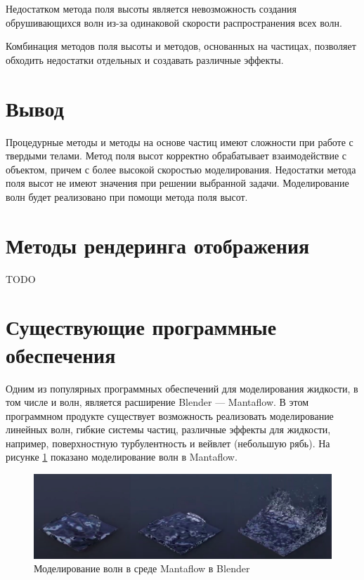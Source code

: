 Недостатком метода поля высоты является невозможность создания обрушивающихся волн  из-за одинаковой скорости распространения всех волн.

Комбинация методов поля высоты и методов, основанных на частицах, позволяет обходить недостатки отдельных и создавать различные эффекты.

\section*{Вывод}

Процедурные методы и методы на основе частиц имеют сложности при работе с твердыми телами. Метод поля высот корректно обрабатывает взаимодействие с объектом, причем с более высокой скоростью моделирования. Недостатки метода поля высот не имеют значения при решении выбранной задачи. Моделирование волн будет реализовано при помощи метода поля высот.

\section{Методы рендеринга отображения}

TODO

\section{Существующие программные обеспечения}

Одним из популярных программных обеспечений для моделирования жидкости, в том числе и волн, является расширение Blender --- Mantaflow. В этом программном продукте существует возможность реализовать моделирование линейных волн, гибкие системы частиц, различные эффекты для жидкости, например, поверхностную турбулентность и вейвлет (небольшую рябь). На рисунке \ref{img:mantaflow} показано моделирование волн в Mantaflow. 

\begin{figure}[H]
	\begin{center}
		\includegraphics[scale=0.2]{img/mantaflow.png}
	\end{center}
	\captionsetup{justification=centering}
	\caption{Моделирование волн в среде Mantaflow в Blender}
	\label{img:mantaflow}
\end{figure}

